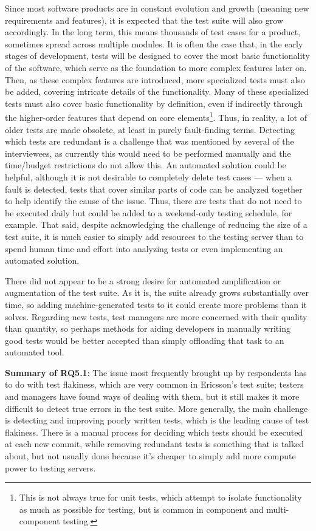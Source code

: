 Since most software products are in constant evolution and growth (meaning new requirements and features), it is expected that the test suite will also grow accordingly.
In the long term, this means thousands of test cases for a product, sometimes spread across multiple modules.
It is often the case that, in the early stages of development, tests will be designed to cover the most basic functionality of the software, which serve as the foundation to more complex features later on.
Then, as these complex features are introduced, more specialized tests must also be added, covering intricate details of the functionality.
Many of these specialized tests must also cover basic functionality by definition, even if indirectly through the higher-order features that depend on core elements\footnote{This is not always true for unit tests, which attempt to isolate functionality as much as possible for testing, but is common in component and multi-component testing.}.
Thus, in reality, a lot of older tests are made obsolete, at least in purely fault-finding terms.
Detecting which tests are redundant is a challenge that was mentioned by several of the interviewees, as currently this would need to be performed manually and the time/budget restrictions do not allow this.
An automated solution could be helpful, although it is not desirable to completely delete test cases — when a fault is detected, tests that cover similar parts of code can be analyzed together to help identify the cause of the issue.
Thus, there are tests that do not need to be executed daily but could be added to a weekend-only testing schedule, for example.
That said, despite acknowledging the challenge of reducing the size of a test suite, it is much easier to simply add resources to the testing server than to spend human time and effort into analyzing tests or even implementing an automated solution.

There did not appear to be a strong desire for automated amplification or augmentation of the test suite.
As it is, the suite already grows substantially over time, so adding machine-generated tests to it could create more problems than it solves.
Regarding new tests, test managers are more concerned with their quality than quantity, so perhaps methods for aiding developers in manually writing good tests would be better accepted than simply offloading that task to an automated tool.

\begin{tcolorbox}%
\textbf{Summary of RQ5.1}: The issue most frequently brought up by respondents has to do with test flakiness, which are very common in Ericsson's test suite; testers and managers have found ways of dealing with them, but it still makes it more difficult to detect true errors in the test suite.
More generally, the main challenge is detecting and improving poorly written tests, which is the leading cause of test flakiness.
There is a manual process for deciding which tests should be executed at each new commit, while removing redundant tests is something that is talked about, but not usually done because it's cheaper to simply add more compute power to testing servers.
\end{tcolorbox}

